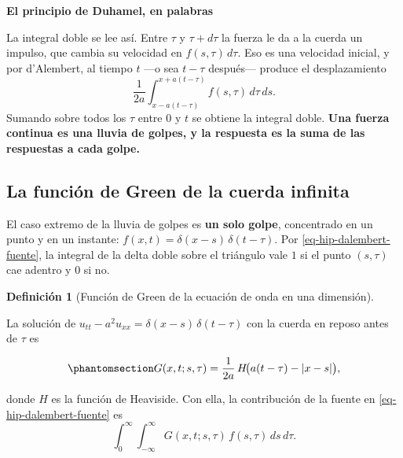 \documentclass[
  spanish,
  a4paper,
]{scrbook}
\theoremstyle{definition}
\newtheorem{definition}{Definición}[chapter]
\theoremstyle{plain}
\theoremstyle{definition}
\theoremstyle{plain}
\theoremstyle{definition}
\theoremstyle{remark}
\begin{document}
\begin{tcolorbox}[enhanced jigsaw, arc=.35mm, bottomrule=.15mm, breakable, colback=white, colframe=quarto-callout-note-color-frame, left=2mm, leftrule=.75mm, opacityback=0, rightrule=.15mm, toprule=.15mm]
\begin{minipage}[t]{5.5mm}
\textcolor{quarto-callout-note-color}{\faInfo}
\end{minipage}%
\begin{minipage}[t]{\textwidth - 5.5mm}

\vspace{-3mm}\textbf{El principio de Duhamel, en palabras}\vspace{3mm}

La integral doble se lee así. Entre \(\tau\) y \(\tau+d\tau\) la fuerza
le da a la cuerda un impulso, que cambia su velocidad en
\(f(s,\tau)\,d\tau\). Eso es una velocidad inicial, y por d'Alembert, al
tiempo \(t\) ---o sea \(t-\tau\) después--- produce el desplazamiento
\[\frac{1}{2a}\int_{x-a(t-\tau)}^{x+a(t-\tau)} f(s,\tau)\,d\tau\,ds .\]
Sumando sobre todos los \(\tau\) entre \(0\) y \(t\) se obtiene la
integral doble. \textbf{Una fuerza continua es una lluvia de golpes, y
la respuesta es la suma de las respuestas a cada golpe.}

\end{minipage}%
\end{tcolorbox}

\subsection{La función de Green de la cuerda
infinita}\label{sec-hip-green-1d}

El caso extremo de la lluvia de golpes es \textbf{un solo golpe},
concentrado en un punto y en un instante:
\(f(x,t) = \delta(x-s)\,\delta(t-\tau)\). Por
\ref{eq-hip-dalembert-fuente}, la integral de la delta doble sobre el
triángulo vale \(1\) si el punto \((s,\tau)\) cae adentro y \(0\) si no.

\begin{definition}[Función de Green de la ecuación de onda en una
dimensión]\protect\hypertarget{def-hip-green-1d}{}\label{def-hip-green-1d}

La solución de \(u_{tt} - a^2u_{xx} = \delta(x-s)\,\delta(t-\tau)\) con
la cuerda en reposo antes de \(\tau\) es

\begin{equation}\protect\phantomsection\label{eq-hip-green-1d}{
G(x,t;s,\tau) = \frac{1}{2a}\,H\!\big(a(t-\tau) - |x-s|\big),
}\end{equation}

donde \(H\) es la función de Heaviside. Con ella, la contribución de la
fuente en \ref{eq-hip-dalembert-fuente} es \[
\int_0^\infty\!\!\int_{-\infty}^{\infty} G(x,t;s,\tau)\,f(s,\tau)\,ds\,d\tau .
\]

\end{definition}
\end{document}
